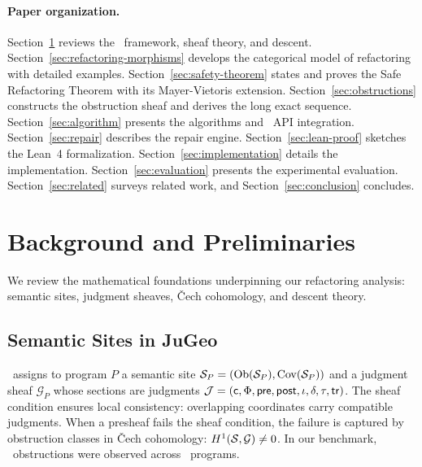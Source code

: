 \documentclass[11pt]{article}
\newcommand{\props}{\Phi}                           %
\newcommand{\precond}{\mathsf{pre}}                  %
\newcommand{\postcond}{\mathsf{post}}                %
\newcommand{\inv}{\iota}                             %
\newcommand{\tr}{\mathsf{tr}}                        %
\begin{document}
\paragraph{Paper organization.}
Section~\ref{sec:background} reviews the \JuGeo\ framework, sheaf
theory, and descent.  Section~\ref{sec:refactoring-morphisms} develops
the categorical model of refactoring with detailed examples.
Section~\ref{sec:safety-theorem} states and proves the Safe Refactoring
Theorem with its Mayer-Vietoris extension.
Section~\ref{sec:obstructions} constructs the obstruction sheaf and
derives the long exact sequence.  Section~\ref{sec:algorithm} presents
the algorithms and \JuGeo\ API integration.
Section~\ref{sec:repair} describes the repair engine.
Section~\ref{sec:lean-proof} sketches the Lean~4 formalization.
Section~\ref{sec:implementation} details the implementation.
Section~\ref{sec:evaluation} presents the experimental evaluation.
Section~\ref{sec:related} surveys related work, and
Section~\ref{sec:conclusion} concludes.

\section{Background and Preliminaries}\label{sec:background}

We review the mathematical foundations underpinning our refactoring
analysis: semantic sites, judgment sheaves, Čech cohomology, and descent
theory.

\subsection{Semantic Sites in JuGeo}\label{ssec:semantic-sites}

\JuGeo\ assigns to program $P$ a semantic site
$\mathcal{S}_P = (\mathrm{Ob}(\mathcal{S}_P), \mathrm{Cov}(\mathcal{S}_P))$ and a judgment sheaf
$\mathcal{G}_P$ whose sections are judgments
$\J = (\coord, \props, \precond, \postcond, \inv, \delta, \tau, \tr)$.
The sheaf condition ensures local consistency: overlapping coordinates
carry compatible judgments.  When a presheaf fails the sheaf condition,
the failure is captured by obstruction classes in Čech cohomology:
$H^{1}(\mathcal{S}, \mathcal{G}) \neq 0$.  In our benchmark,
\compObstructionTotal\ obstructions were observed across
\compTotalPrograms\ programs.
\end{document}

